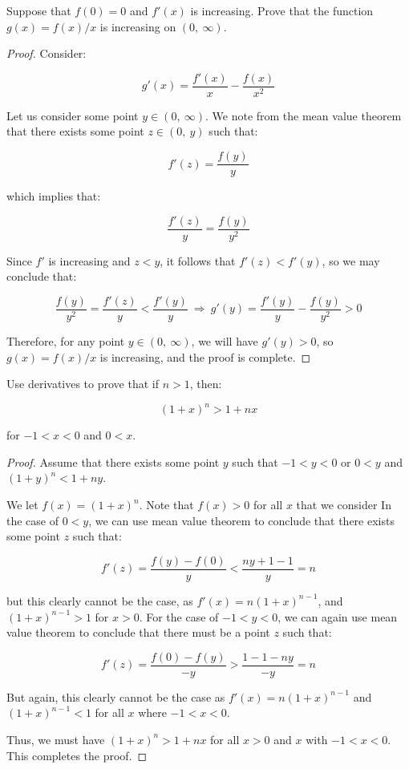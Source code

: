 \documentclass[10pt, oneside]{amsart}
\newenvironment{problem}[2][Problem]{\begin{trivlist}
\item[\hskip \labelsep {\bfseries #1}\hskip \labelsep {\bfseries #2.}]}{\end{trivlist}}
\begin{document}
    \begin{problem}{11.60}
      Suppose that $f(0) = 0$ and $f'(x)$ is increasing. Prove that the function $g(x) = f(x)/x$ is increasing on $(0, \ \infty)$.
    \end{problem}

    \begin{proof}
      Consider:

      $$g'(x) = \frac{f'(x)}{x} - \frac{f(x)}{x^2}$$

      Let us consider some point $y \in (0, \ \infty)$. We note from the mean value theorem that there exists some point $z \in (0, \ y)$ such that:

      $$f'(z) = \frac{f(y)}{y}$$

      which implies that:

      $$\frac{f'(z)}{y} = \frac{f(y)}{y^2}$$

      Since $f'$ is increasing and $z < y$, it follows that $f'(z) < f'(y)$, so we may conclude that:

      $$\frac{f(y)}{y^2} = \frac{f'(z)}{y} < \frac{f'(y)}{y} \ \Rightarrow \ g'(y) = \frac{f'(y)}{y} - \frac{f(y)}{y^2} > 0$$

      Therefore, for any point $y \in (0, \ \infty)$, we will have $g'(y) > 0$, so $g(x) = f(x)/x$ is increasing, and the proof is complete.
    \end{proof}

    \begin{problem}{11.61}
      Use derivatives to prove that if $n > 1$, then:

      $$(1 + x)^{n} > 1 + nx$$

      for $-1 < x < 0$ and $0 < x$.
    \end{problem}

    \begin{proof}
      Assume that there exists some point $y$ such that
      $-1 < y < 0$ or $0 < y$ and $(1 + y)^{n} < 1 + ny$.
      \newline

      We let $f(x) = (1 + x)^{n}$. Note that $f(x) > 0$ for all $x$ that we consider
      In the case of $0 < y$, we can use mean value theorem to conclude that there exists some point $z$ such that:

      $$f'(z) = \frac{f(y) - f(0)}{y} < \frac{ny + 1 - 1}{y} = n$$

      but this clearly cannot be the case, as $f'(x) = n(1 + x)^{n - 1}$, and $(1 + x)^{n - 1} > 1$ for $x > 0$.
      For the case of $-1 < y < 0$, we can again use mean value theorem to conclude that there must be a point $z$ such that:

      $$f'(z) = \frac{f(0) - f(y)}{-y} > \frac{1 - 1 - ny}{-y} = n$$

      But again, this clearly cannot be the case as $f'(x) = n(1 + x)^{n - 1}$ and $(1 + x)^{n - 1} < 1$ for all $x$ where $-1 < x < 0$.
      \newline

      Thus, we must have $(1 + x)^{n} > 1 + nx$ for all $x > 0$ and $x$ with $-1 < x < 0$. This completes the proof.
      \end{proof}
\end{document}
